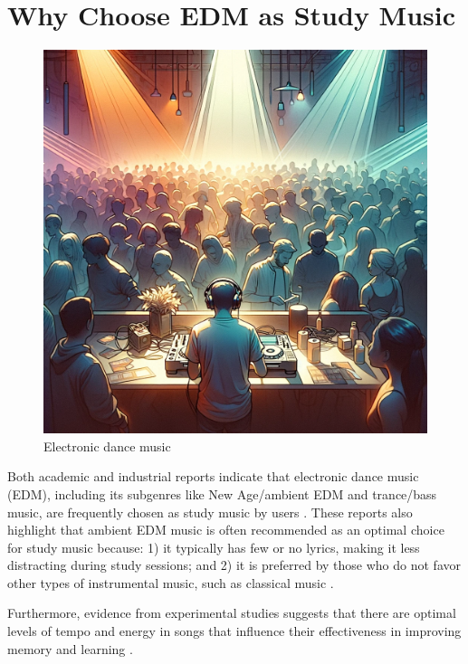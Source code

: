 \documentclass[
]{book}
\begin{document}
\hypertarget{why-choose-edm-as-study-music}{%
\section{Why Choose EDM as Study Music}\label{why-choose-edm-as-study-music}}

\begin{figure}
\centering
\includegraphics{4.png}
\caption{Electronic dance music}
\end{figure}

Both academic and industrial reports indicate that electronic dance music (EDM), including its subgenres like New Age/ambient EDM and trance/bass music, are frequently chosen as study music by users \citep[e.g.,][]{bosk2022electronic, dov2020positive, NationalUniversity2021}. These reports also highlight that ambient EDM music is often recommended as an optimal choice for study music because: 1) it typically has few or no lyrics, making it less distracting during study sessions; and 2) it is preferred by those who do not favor other types of instrumental music, such as classical music \citep{NationalUniversity2021}.

Furthermore, evidence from experimental studies suggests that there are optimal levels of tempo and energy in songs that influence their effectiveness in improving memory and learning \citep[e.g.,][]{musliu2017impact}.
\end{document}
